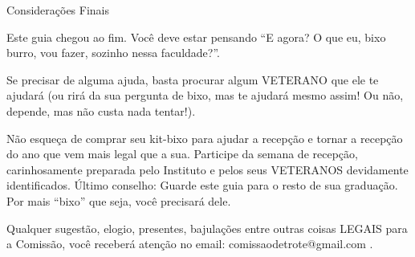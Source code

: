 \begin{secao}{Considerações Finais}

Este guia chegou ao fim. Você deve estar pensando ``E agora? O que eu, bixo
burro, vou fazer, sozinho nessa faculdade?''.

Se precisar de alguma ajuda, basta procurar algum VETERANO que ele te
ajudará (ou rirá da sua pergunta de bixo, mas te ajudará mesmo assim! Ou não,
depende, mas não custa nada tentar!).

Não esqueça de comprar seu kit-bixo para ajudar a recepção e tornar a recepção
do ano que vem mais legal que a sua. Participe da semana de recepção,
carinhosamente preparada pelo Instituto e pelos seus VETERANOS devidamente
identificados. Último conselho: Guarde este guia para o resto de sua graduação.
Por mais ``bixo'' que seja, você precisará dele.

Qualquer sugestão, elogio, presentes, bajulações entre outras coisas LEGAIS
para a Comissão, você receberá atenção no email: comissaodetrote@gmail.com .

\end{secao}
